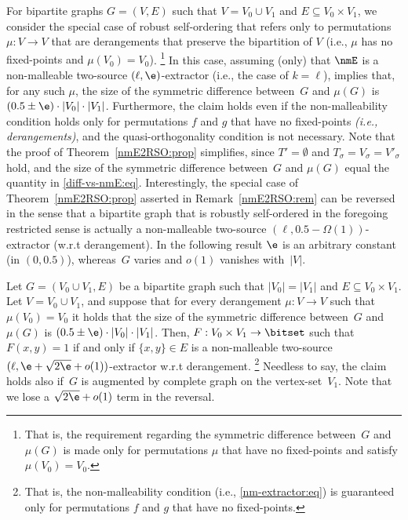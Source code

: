\label{nmE2RSO:rem}
For bipartite graphs $G=(V,E)$ such that $V=V_0\cup V_1$
and $E\subseteq V_0\times V_1$,
we consider the special case of robust self-ordering
that refers only to permutations $\mu:V\to V$
that are derangements that preserve the bipartition of $V$
{\rm(i.e., $\mu$ has no fixed-points and $\mu(V_0)=V_0$)}.
\footnote{That is, the requirement regarding the symmetric difference
between~$G$ and $\mu(G)$ is made only for permutations $\mu$
that have no fixed-points and satisfy $\mu(V_0)=V_0$.}
%
%
In this case, assuming {\rm(only)} that $\nmE$ is
a non-malleable two-source $(\ell,\e)$-extractor
{\rm(i.e., the case of $k=\ell$)},
implies that, for any such $\mu$,
the size of the symmetric difference between~$G$ and $\mu(G)$
is $(0.5\pm\e)\cdot|V_0|\cdot|V_1|$.
Furthermore, the claim holds even if the non-malleability condition
holds only for permutations $f$ and $g$ that have no fixed-points
{\em(i.e., derangements)},
and the quasi-orthogonality condition is not necessary.
Note that the proof of Theorem~\ref{nmE2RSO:prop} simplifies,
since $T'=\emptyset$ and $T_\sigma=V_\sigma=V'_\sigma$ hold,
and the size of the symmetric difference between~$G$ and $\mu(G)$
equal the quantity in \eqref{diff-vs-nmE:eq}.
\ER
Interestingly, the special case of Theorem~\ref{nmE2RSO:prop}
asserted in Remark~\ref{nmE2RSO:rem} can be reversed in the
sense that a bipartite graph that is robustly self-ordered
in the foregoing restricted sense is actually
a non-malleable two-source $(\ell,0.5-\Omega(1))$-extractor
(w.r.t derangement).
In the following result $\e$ is an arbitrary constant (in $(0,0.5)$),
whereas~$G$ varies and $o(1)$ vanishes with~$|V|$.

\label{reverse-nmE2RSO:prop}
Let $G=(V_0\cup V_1,E)$ be a bipartite graph
such that $|V_0|=|V_1|$ and $E\subseteq V_0\times V_1$.
%
%
Let $V=V_0\cup V_1$, and
suppose that for every derangement $\mu:V\to V$
such that $\mu(V_0)=V_0$ it holds that the
size of the symmetric difference between~$G$ and $\mu(G)$
is $(0.5\pm\e)\cdot|V_0|\cdot|V_1|$.
Then, $F:V_0\times V_1\to\bitset$
such that $F(x,y)=1$ if and only if $\{x,y\}\in E$
is a non-malleable two-source $(\ell,\e+{\sqrt{2\e}}+o(1))$-extractor
w.r.t derangement.
\footnote{That is, the non-malleability condition
(i.e., \eqref{nm-extractor:eq}) is guaranteed
only for permutations $f$ and $g$ that have no fixed-points.}
\EP
Needless to say, the claim holds also if~$G$ is augmented
by complete graph on the vertex-set~$V_1$.
Note that we lose a $\sqrt{2\e}+o(1)$ term in the reversal.
%
%
\medskip

